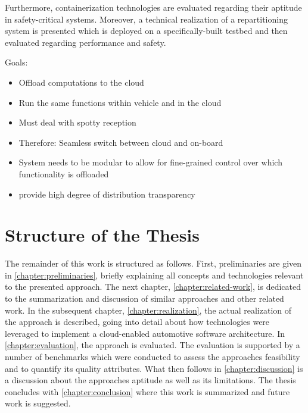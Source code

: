 Furthermore, containerization technologies are evaluated regarding their aptitude in safety-critical systems. Moreover, a technical realization of a repartitioning system is presented which is deployed on a specifically-built testbed and then evaluated regarding performance and safety.


Goals:
\begin{itemize}
\item Offload computations to the cloud
\item Run the same functions within vehicle and in the cloud
\item Must deal with spotty reception
\item Therefore: Seamless switch between cloud and on-board
\item System needs to be modular to allow for fine-grained control over which functionality is offloaded 
\item provide high degree of distribution transparency
\end{itemize}


%
%
%
%
%
%
%
%
%
%


\section{Structure of the Thesis}

The remainder of this work is structured as follows. First, preliminaries are given in \autoref{chapter:preliminaries}, briefly explaining all concepts and technologies relevant to the presented approach. The next chapter, \autoref{chapter:related-work}, is dedicated to the summarization and discussion of similar approaches and other related work. In the subsequent chapter, \autoref{chapter:realization}, the actual realization of the approach is described, going into detail about how technologies were leveraged to implement a cloud-enabled automotive software architecture. In \autoref{chapter:evaluation}, the approach is evaluated. The evaluation is supported by a number of benchmarks which were conducted to assess the approaches feasibility and to quantify its quality attributes. What then follows in \autoref{chapter:discussion} is a discussion about the approaches aptitude as well as its limitations. The thesis concludes with \autoref{chapter:conclusion} where this work is summarized and future work is suggested.

%
%
%
%
%
%
%
%
%
%
%
%
%
%
%
%
%
%
%
%
%
%
%
%
%
%
%
%
%
%
%
%
%
%
%
%
%
%
